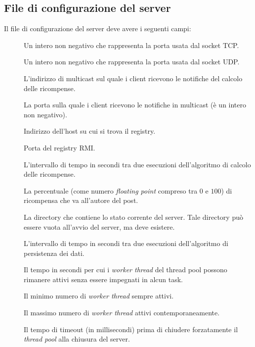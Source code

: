 \documentclass[
    oneside,
    10pt,
    language=italian,
    a4paper,
    article
]{notes}
\begin{document}
\subsection{File di configurazione del server}
Il file di configurazione del server deve avere i seguenti campi:
\begin{description}
    \item[] Un intero non negativo che rappresenta la porta usata dal socket TCP. 
    \item[] Un intero non negativo che rappresenta la porta usata dal socket UDP.
    \item[] L'indirizzo di multicast sul quale i client ricevono
        le notifiche del calcolo delle ricompense.
    \item[] La porta sulla quale i client ricevono le notifiche
        in multicast (è un intero non negativo).
    \item[] Indirizzo dell'host su cui si trova il registry.
    \item[] Porta del registry RMI.
    \item[] L'intervallo di tempo in secondi tra due esecuzioni
        dell'algoritmo di calcolo delle ricompense.
    \item[] La percentuale (come numero \emph{floating point}
        compreso tra $0$ e $100$) di ricompensa che va all'autore del post.
    \item[] La directory che contiene lo stato corrente del server.
        Tale directory può essere vuota all'avvio del server, ma deve esistere.
    \item[] L'intervallo di tempo in secondi tra due
        esecuzioni dell'algoritmo di persistenza dei dati.
    \item[] Il tempo in secondi per cui i \emph{worker thread} del
        thread pool possono rimanere attivi senza essere impegnati in alcun task.
    \item[] Il minimo numero di \emph{worker thread} sempre attivi.
    \item[] Il massimo numero di \emph{worker thread} attivi contemporaneamente.
    \item[] Il tempo di timeout (in millisecondi) prima di chiudere
        forzatamente il \emph{thread pool} alla chiusura del server.         
\end{description}
\end{document}
